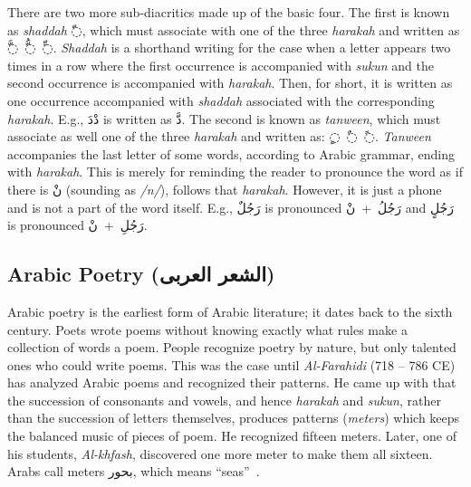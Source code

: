There are two more sub-diacritics made up of the basic four. The first is known as \textit{shaddah}
\textarabic{◌ّ}, which must associate with one of the three \textit{harakah} and written as
\mbox{\textarabic{◌َّ} \textarabic{◌ُّ} \textarabic{◌ِّ}}. \textit{Shaddah} is a shorthand writing for the
case when a letter appears two times in a row where the first occurrence is accompanied with
\textit{sukun} and the second occurrence is accompanied with \textit{harakah}. Then, for short, it
is written as one occurrence accompanied with \textit{shaddah} associated with the corresponding
\textit{harakah}. E.g., \mbox{\textarabic{دْدَ}} is written as \textarabic{دَّ}. The second is known as
\textit{tanween}, which must associate as well one of the three \textit{harakah} and written as:
\mbox{\textarabic{◌ٍ} \textarabic{◌ٌ} \textarabic{◌ً}}. \textit{Tanween} accompanies the last letter of
some words, according to Arabic grammar, ending with \textit{harakah}. This is merely for reminding
the reader to pronounce the word as if there is \textarabic{نْ} (sounding as \textit{/n/}), follows
that \textit{harakah}. However, it is just a phone and is not a part of the word itself. E.g.,
\textarabic{رَجُلٌ} is pronounced \mbox{\textarabic{رَجُلُ + نْ}} and \textarabic{رَجُلٍ} is pronounced
\mbox{\textarabic{رَجُلِ + نْ}}.


\subsection{Arabic Poetry (\textarabic{الشعر العربى})}\label{sec:arab-poetry-text}
Arabic poetry is the earliest form of Arabic literature; it dates back to the sixth century. Poets
wrote poems without knowing exactly what rules make a collection of words a poem. People recognize
poetry by nature, but only talented ones who could write poems. This was the case until
\textit{Al-Farahidi} (718 – 786 CE) has analyzed Arabic poems and recognized their patterns. He came
up with that the succession of consonants and vowels, and hence \textit{harakah} and \textit{sukun},
rather than the succession of letters themselves, produces patterns (\textit{meters}) which keeps
the balanced music of pieces of poem. He recognized fifteen meters. Later, one of his students,
\textit{Al-khfash}, discovered one more meter to make them all sixteen. Arabs call meters
\textarabic{بحور}, which means ``seas''~\cite{Moustafa}.


